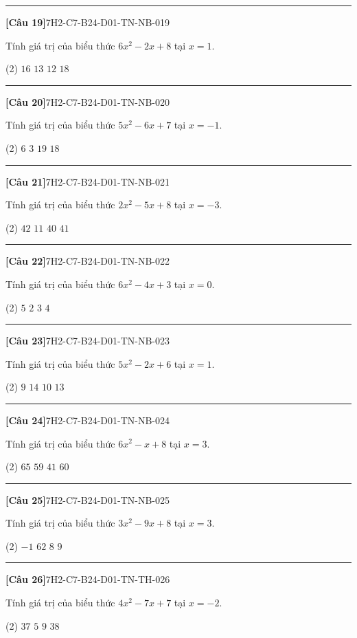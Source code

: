 \documentclass[12pt,a4paper]{article}
\newif\ifloigiai
\newenvironment{cauhoi}[2]{%
  \par\medskip\noindent\rule{\textwidth}{0.4pt}\par\nopagebreak
  \noindent\textbf{[#1]}\hfill{\scriptsize\ttfamily #2}\par\nopagebreak\smallskip}{\par}
\newcommand{\dapan}[1]{\ifloigiai\par\smallskip\noindent\textit{Đáp án:} \textbf{#1}\par\fi}
\begin{document}
\begin{cauhoi}{Câu 19}{7H2-C7-B24-D01-TN-NB-019}
Tính giá trị của biểu thức $6x^{2}-2x+8$ tại $x=1$.
\begin{tasks}(2)
\task $16$
\task $13$
\task $12$
\task $18$
\end{tasks}
\dapan{C}
\end{cauhoi}
\begin{cauhoi}{Câu 20}{7H2-C7-B24-D01-TN-NB-020}
Tính giá trị của biểu thức $5x^{2}-6x+7$ tại $x=-1$.
\begin{tasks}(2)
\task $6$
\task $3$
\task $19$
\task $18$
\end{tasks}
\dapan{D}
\end{cauhoi}
\begin{cauhoi}{Câu 21}{7H2-C7-B24-D01-TN-NB-021}
Tính giá trị của biểu thức $2x^{2}-5x+8$ tại $x=-3$.
\begin{tasks}(2)
\task $42$
\task $11$
\task $40$
\task $41$
\end{tasks}
\dapan{D}
\end{cauhoi}
\begin{cauhoi}{Câu 22}{7H2-C7-B24-D01-TN-NB-022}
Tính giá trị của biểu thức $6x^{2}-4x+3$ tại $x=0$.
\begin{tasks}(2)
\task $5$
\task $2$
\task $3$
\task $4$
\end{tasks}
\dapan{C}
\end{cauhoi}
\begin{cauhoi}{Câu 23}{7H2-C7-B24-D01-TN-NB-023}
Tính giá trị của biểu thức $5x^{2}-2x+6$ tại $x=1$.
\begin{tasks}(2)
\task $9$
\task $14$
\task $10$
\task $13$
\end{tasks}
\dapan{A}
\end{cauhoi}
\begin{cauhoi}{Câu 24}{7H2-C7-B24-D01-TN-NB-024}
Tính giá trị của biểu thức $6x^{2}-x+8$ tại $x=3$.
\begin{tasks}(2)
\task $65$
\task $59$
\task $41$
\task $60$
\end{tasks}
\dapan{B}
\end{cauhoi}
\begin{cauhoi}{Câu 25}{7H2-C7-B24-D01-TN-NB-025}
Tính giá trị của biểu thức $3x^{2}-9x+8$ tại $x=3$.
\begin{tasks}(2)
\task $-1$
\task $62$
\task $8$
\task $9$
\end{tasks}
\dapan{C}
\end{cauhoi}
\begin{cauhoi}{Câu 26}{7H2-C7-B24-D01-TN-TH-026}
Tính giá trị của biểu thức $4x^{2}-7x+7$ tại $x=-2$.
\begin{tasks}(2)
\task $37$
\task $5$
\task $9$
\task $38$
\end{tasks}
\dapan{A}
\end{cauhoi}
\end{document}
